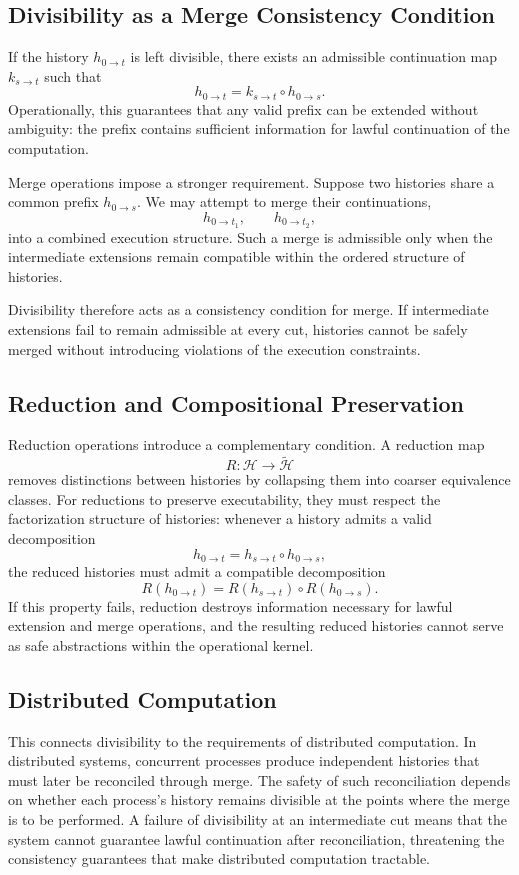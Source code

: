 \documentclass[12pt]{article}
\begin{document}
\subsection{Divisibility as a Merge Consistency Condition}

If the history $h_{0 \to t}$ is left divisible, there exists an admissible continuation map
$k_{s \to t}$ such that
\[
h_{0 \to t} = k_{s \to t} \circ h_{0 \to s}.
\]
Operationally, this guarantees that any valid prefix can be extended without ambiguity: the
prefix contains sufficient information for lawful continuation of the computation.

Merge operations impose a stronger requirement. Suppose two histories share a common prefix
$h_{0 \to s}$. We may attempt to merge their continuations,
\[
h_{0 \to t_1}, \qquad h_{0 \to t_2},
\]
into a combined execution structure. Such a merge is admissible only when the intermediate
extensions remain compatible within the ordered structure of histories.

Divisibility therefore acts as a consistency condition for merge. If intermediate extensions
fail to remain admissible at every cut, histories cannot be safely merged without introducing
violations of the execution constraints.

\subsection{Reduction and Compositional Preservation}

Reduction operations introduce a complementary condition. A reduction map
\[
R : \mathcal{H} \to \widetilde{\mathcal{H}}
\]
removes distinctions between histories by collapsing them into coarser equivalence classes.
For reductions to preserve executability, they must respect the factorization structure of
histories: whenever a history admits a valid decomposition
\[
h_{0 \to t} = h_{s \to t} \circ h_{0 \to s},
\]
the reduced histories must admit a compatible decomposition
\[
R(h_{0 \to t}) = R(h_{s \to t}) \circ R(h_{0 \to s}).
\]
If this property fails, reduction destroys information necessary for lawful extension and
merge operations, and the resulting reduced histories cannot serve as safe abstractions within
the operational kernel.

\subsection{Distributed Computation}

This connects divisibility to the requirements of distributed computation. In distributed
systems, concurrent processes produce independent histories that must later be reconciled
through merge. The safety of such reconciliation depends on whether each process's history
remains divisible at the points where the merge is to be performed. A failure of divisibility
at an intermediate cut means that the system cannot guarantee lawful continuation after
reconciliation, threatening the consistency guarantees that make distributed computation
tractable.
\end{document}

